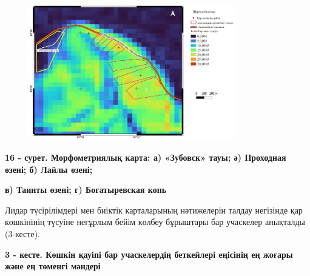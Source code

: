 \begin{figure}[H]
	\centering
	\includegraphics[width=0.8\textwidth]{media/ict2/image223}
	\caption*{}
\end{figure}

{\bfseries 16 - сурет. Морфометриялық карта: а) «Зубовск» тауы; ә) Проходная өзені; б) Лайлы өзені;}

{\bfseries в) Таинты өзені; г) Богатыревская копь}

Лидар түсірілімдері мен биіктік карталарының нәтижелерін талдау
негізінде қар көшкінінің түсуіне неғұрлым бейім көлбеу бұрыштары бар
учаскелер анықталды (3-кесте).

{\bfseries 3 - кесте. Көшкін қауіпі бар учаскелердің беткейлері еңісінің ең жоғары және ең төменгі мәндері}


